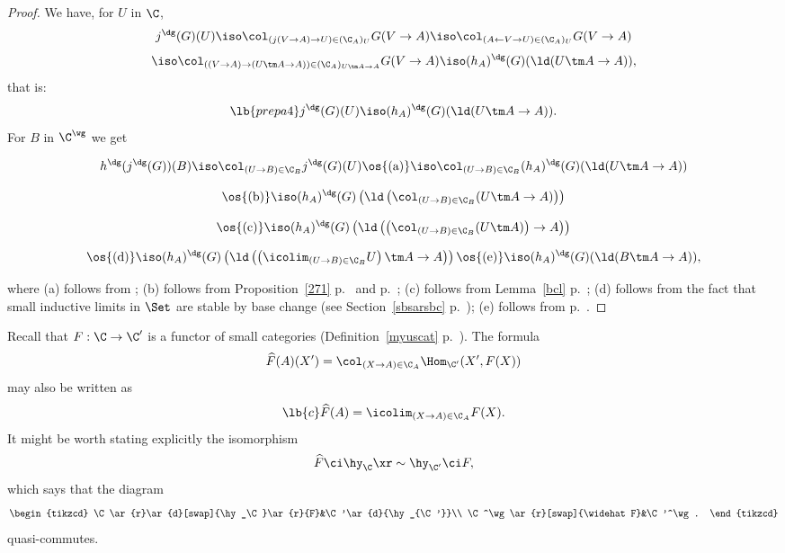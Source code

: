 \documentclass[12pt]{article}
\theoremstyle{remark}
\theoremstyle{definition}
\begin{document}
\begin{proof}
We have, for $U$ in $\C$, 
$$
j^\dg(G)(U)\iso\col_{(j(V\to A)\to U)\in(\C_A)_U}G(V\to A)\iso\col_{(A\leftarrow V\to U)\in(\C_A)_U}G(V\to A)
$$
$$
\iso\col_{((V\to A)\to(U\tm A\to A))\in(\C_A)_{U\tm A\to A}}G(V\to A)\iso(h_A)^\dg(G)(\ld(U\tm A\to A)),
$$
that is: 
\begin{equation}\lb{prepa4}
j^\dg(G)(U)\iso(h_A)^\dg(G)(\ld(U\tm A\to A)).
\end{equation} 
For $B$ in $\C^\wg$ we get 

$$h^\dg(j^\dg(G))(B)\iso\col_{(U\to B)\in\C_B}j^\dg(G)(U)\os{(\text a)}\iso\col_{(U\to B)\in\C_B}(h_A)^\dg(G)(\ld(U\tm A\to A))$$

$$\os{(\text b)}\iso(h_A)^\dg(G)\left(\ld\left(\col_{(U\to B)\in\C_B}(U\tm A\to A)\right)\right)$$

$$\os{(\text c)}\iso(h_A)^\dg(G)\left(\ld\left(\left(\col_{(U\to B)\in\C_B}(U\tm A)\right)\to A\right)\right)$$

$$\os{(\text d)}\iso(h_A)^\dg(G)\left(\ld\left(\left(\icolim_{(U\to B)\in\C_B}U\right)\tm A\to A\right)\right)\os{(\text e)}\iso(h_A)^\dg(G)(\ld(B\tm A\to A)),$$ 

\nn where 
(a) follows from ; 
(b) follows from Proposition~\ref{271} p.~ and  p.~;  
(c) follows from Lemma~\ref{bcl} p.~; 
(d) follows from the fact that small inductive limits in $\Set$ are stable by base change (see Section~\ref{sbsarsbc} p.~); 
(e) follows from  p.~.
\end{proof}



Recall that $F:\C\to\C'$ is a functor of small categories (Definition~\ref{myuscat} p.~). The formula 
$$
\widehat F(A)(X')=\col_{(X\to A)\in\C_A}\Hom_{\C'}(X',F(X))
$$ 
may also be written as 
\begin{equation}\lb{c}
\widehat F(A)=\icolim_{(X\to A)\in\C_A}F(X).
\end{equation}
It might be worth stating explicitly the isomorphism 
$$
\widehat F\ci\hy_\C\xr\sim\hy_{\C'}\ci F, 
$$ 
which says that the diagram 
$$
\begin{tikzcd}
\C\ar{r}\ar{d}[swap]{\hy_\C}\ar{r}{F}&\C'\ar{d}{\hy_{\C'}}\\ 
\C^\wg\ar{r}[swap]{\widehat F}&\C'^\wg.
\end{tikzcd}
$$ 
quasi-commutes. 
\end{document}
